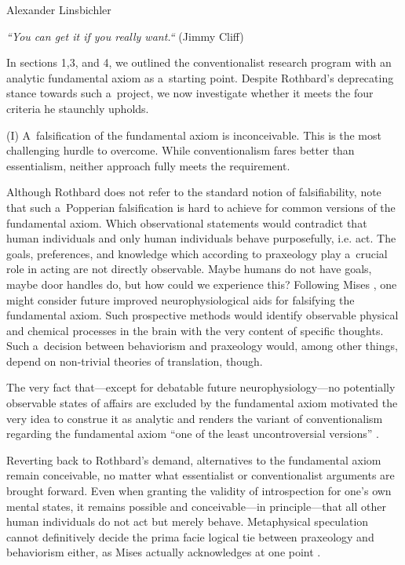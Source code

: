 \begin{artengenv}{Alexander Linsbichler}
\begin{flushright}
\textit{``You can get it if you really want.``} (Jimmy Cliff)
\end{flushright}






In sections 1,3, and 4, we outlined the conventionalist research program with an analytic fundamental axiom as a~starting point. Despite Rothbard's deprecating stance towards such a~project, we now investigate whether it meets the four criteria he staunchly upholds.

\medskip

\noindent (I) A~falsification of the fundamental axiom is inconceivable. This is the most challenging hurdle to overcome. While conventionalism fares better than essentialism, neither approach fully meets the requirement.



Although Rothbard does not refer to the standard notion of falsifiability, note that such a~Popperian falsification is hard to achieve for common versions of the fundamental axiom. Which observational statements would contradict that human individuals and only human individuals behave purposefully, i.e. act. The goals, preferences, and knowledge which according to praxeology play a~crucial role in acting are not directly observable. Maybe humans do not have goals, maybe door handles do, but how could we experience this? Following Mises 
\parencite*[][p.85]{mises_nationalokonomie_1940}, %
 one might consider future improved neurophysiological aids for falsifying the fundamental axiom. Such prospective methods would identify observable physical and chemical processes in the brain with the very content of specific thoughts. Such a~decision between behaviorism and praxeology would, among other things, depend on non-trivial theories of translation, though.



The very fact that---except for debatable future neurophysiology---no potentially observable states of affairs are excluded by the fundamental axiom motivated the very idea to construe it as analytic and renders the variant of conventionalism regarding the fundamental axiom ``one of the least uncontroversial versions'' 
\parencite[][p.3371]{linsbichler_austrian_2021}.%




Reverting back to Rothbard's demand, alternatives to the fundamental axiom remain conceivable, no matter what essentialist or conventionalist arguments are brought forward. Even when granting the validity of introspection for one's own mental states, it remains possible and conceivable---in principle---that all other human individuals do not act but merely behave. Metaphysical speculation cannot definitively decide the prima facie logical tie between praxeology and behaviorism either, as Mises actually acknowledges at one point 
\parencite[][pp.84–86]{mises_nationalokonomie_1940}.%





\end{artengenv}
